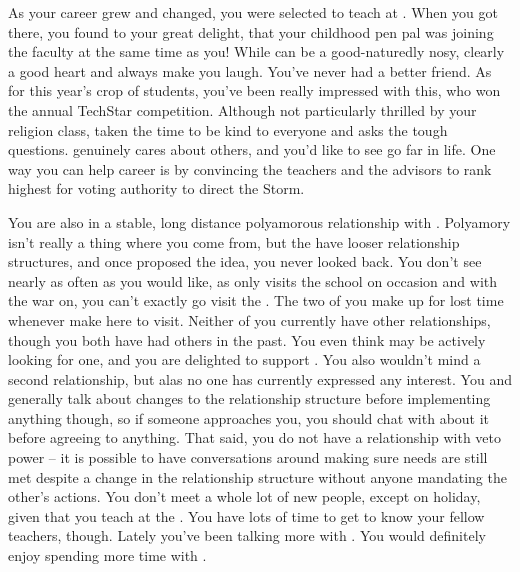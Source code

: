 \documentclass[char]{GL2020}
\begin{document}
As your career grew and changed, you were selected to teach at \pSchool{}. When you got there, you found to your great delight, that your childhood pen pal \cMusic{} was joining the faculty at the same time as you! While \cMusic{} can be a good-naturedly nosy, \cMusic{\they} clearly \cMusic{\have} a good heart and always make\cMusic{\plural} you laugh. You've never had a better friend. As for this year's crop of students, you've been really impressed with this\cTechStar{\full}, who won the annual TechStar competition. Although \cTechStar{\theyare} not particularly thrilled by your religion class, \cTechStar{\they} \cTechStar{\have} taken the time to be kind to everyone and asks the tough questions. \cTechStar{\They} genuinely cares about others, and you'd like to see \cTechStar{\them} go far in life. One way you can help \cTechStar{\their} career is by convincing the \pShip{} teachers and the \pTech{} advisors to rank \cTechStar{\them} highest for voting authority to direct the Storm.

You are also in a stable, long distance polyamorous relationship with \cJuniorStatesman{\full}. Polyamory isn't really a thing where you come from, but the \pShippies{} have looser relationship structures, and once \cJuniorStatesman{} proposed the idea, you never looked back. You don't see \cJuniorStatesman{\them} nearly as often as you would like, as \cJuniorStatesman{\they} only visits the school on occasion and with the war on, you can't exactly go visit the \pShip{}. The two of you make up for lost time whenever \cJuniorStatesman{\they} \cJuniorStatesman{\does} make here to visit. Neither of you currently have other relationships, though you both have had others in the past. You even think \cJuniorStatesman{} may be actively looking for one, and you are delighted to support \cJuniorStatesman{\them}. You also wouldn't mind a second relationship, but alas no one has currently expressed any interest. You and \cJuniorStatesman{} generally talk about changes to the relationship structure before implementing anything though, so if someone approaches you, you should chat with \cJuniorStatesman{} about it before agreeing to anything. That said, you do not have a relationship with veto power – it is possible to have conversations around making sure needs are still met despite a change in the relationship structure without anyone mandating the other's actions. You don't meet a whole lot of new people, except on holiday, given that you teach at the \pSc{}. You have lots of time to get to know your fellow teachers, though. Lately you've been talking more with \cEthics{\full}. You would definitely enjoy spending more time with \cEthics{\them}.
\end{document}
